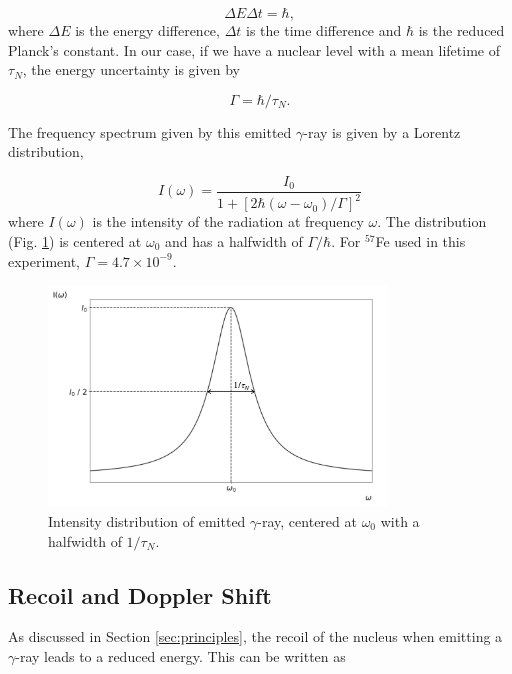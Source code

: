 \documentclass[a4paper]{report}
\numberwithin{equation}{section}
\begin{document}
\begin{equation}
		\Delta E \Delta t = \hbar,
\end{equation}
where $\Delta E $ is the energy difference, $\Delta t$ is the time difference and $\hbar $ is the reduced Planck's constant. In our case, if we have a nuclear level with a mean lifetime of $\tau _{N}$, the energy uncertainty is given by

\begin{equation} \label{eqn:uncertainty}
		\Gamma = \hbar / \tau _{N}.	
\end{equation}

The frequency spectrum given by this emitted $\gamma$-ray is given by a Lorentz distribution, 

\begin{equation}
		I (\omega) = \frac{I_{0}}{1 + [2 \hbar (\omega - \omega_{0})/\Gamma]^2}
\end{equation}
where $I(\omega)$ is the intensity of the radiation at frequency $\omega$. The distribution (Fig. \ref{fig:lorentz}) is centered at $\omega_{0}$ and has a halfwidth of $\Gamma / \hbar $. For $^{57}$Fe used in this experiment, $\Gamma = 4.7 \times 10^{-9}$. 

\begin{figure}[htpb]
    \centering
    \includegraphics[width=0.8\textwidth]{lorentz}
    \caption{Intensity distribution of emitted $\gamma$-ray, centered at $\omega_{0}$ with a halfwidth of $1 / \tau _{N}$.}
    \label{fig:lorentz}
\end{figure}

\subsection{Recoil and Doppler Shift}

As discussed in Section \ref{sec:principles}, the recoil of the nucleus when emitting a $\gamma$-ray leads to a reduced energy. This can be written as
\end{document}
